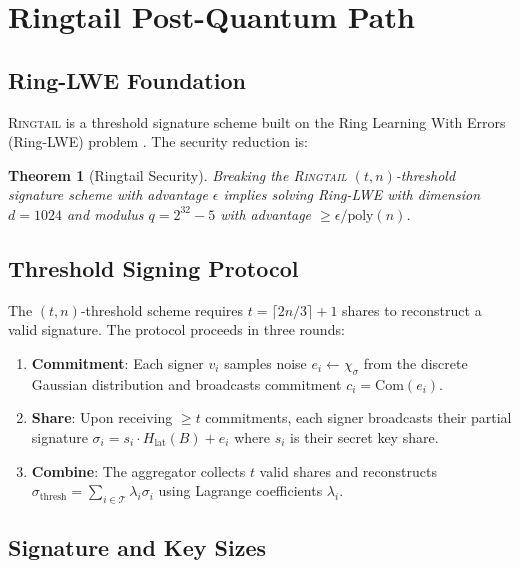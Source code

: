 \documentclass[11pt,letterpaper]{article}
\newtheorem{theorem}{Theorem}
\theoremstyle{definition}
\theoremstyle{remark}
\newcommand{\Ringtail}{\textsc{Ringtail}}
\begin{document}
\section{Ringtail Post-Quantum Path}

\subsection{Ring-LWE Foundation}

\Ringtail{} is a threshold signature scheme built on the Ring Learning With Errors (Ring-LWE) problem \cite{lyubashevsky2010ideal, lux-ringtail-pq}. The security reduction is:

\begin{theorem}[Ringtail Security]
Breaking the \Ringtail{} $(t, n)$-threshold signature scheme with advantage $\epsilon$ implies solving Ring-LWE with dimension $d = 1024$ and modulus $q = 2^{32} - 5$ with advantage $\geq \epsilon / \text{poly}(n)$.
\end{theorem}

\subsection{Threshold Signing Protocol}

The $(t, n)$-threshold scheme requires $t = \lceil 2n/3 \rceil + 1$ shares to reconstruct a valid signature. The protocol proceeds in three rounds:

\begin{enumerate}
\item \textbf{Commitment}: Each signer $v_i$ samples noise $e_i \leftarrow \chi_\sigma$ from the discrete Gaussian distribution and broadcasts commitment $c_i = \text{Com}(e_i)$.
\item \textbf{Share}: Upon receiving $\geq t$ commitments, each signer broadcasts their partial signature $\sigma_i = s_i \cdot H_{\text{lat}}(B) + e_i$ where $s_i$ is their secret key share.
\item \textbf{Combine}: The aggregator collects $t$ valid shares and reconstructs $\sigma_{\text{thresh}} = \sum_{i \in \mathcal{T}} \lambda_i \sigma_i$ using Lagrange coefficients $\lambda_i$.
\end{enumerate}

\subsection{Signature and Key Sizes}
\end{document}
